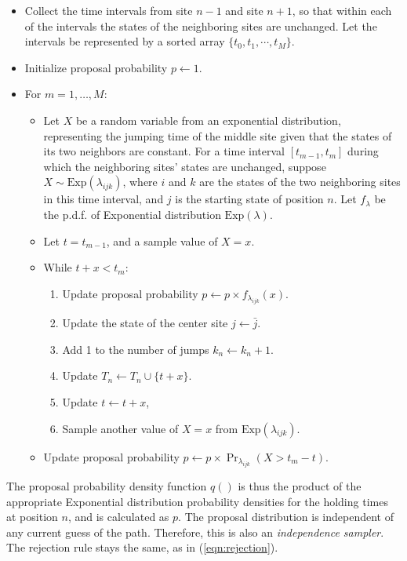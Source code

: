 \documentclass[11pt]{article}
\begin{document}
\begin{itemize}
\item Collect the time intervals from site $n-1$ and site $n+1$, so
  that within each of the intervals the states of the neighboring
  sites are unchanged. Let the intervals be represented by a sorted
  array $\{t_0, t_1, \cdots, t_M\}$. 
\item Initialize proposal probability $p\leftarrow 1$.
\item For $m = 1, \ldots, M$:
  \begin{itemize}
  \item Let $X$ be a random variable from an exponential distribution,
    representing the jumping time of the middle site given that the states
    of its two neighbors are constant.  For a time interval $[t_{m-1},
    t_m]$ during which the neighboring sites' states are unchanged,
    suppose $X \sim \text{Exp}(\lambda_{ijk})$, where $i$ and $k$ are the
    states of the two neighboring sites in this time interval, and $j$ is
    the starting state of position $n$. Let $f_{\lambda}$ be the p.d.f. of
    Exponential distribution $\text{Exp}(\lambda)$.
  \item Let $t = t_{m-1}$, and a sample value of $X=x$.
  \item While $t + x < t_m$:
    \begin{enumerate}[label={(\arabic*)}]
    \item Update proposal probability $p \leftarrow p\times f_{\lambda_{ijk}}(x)$.
    \item Update the state of the center site $j \leftarrow \bar{j}$.
    \item Add 1 to the number of jumps $k_n \leftarrow k_n +1$.
    \item Update $T_n \leftarrow T_n\cup\{t+x\}$.
    \item Update $t \leftarrow  t+x$,
    \item Sample another value of $X=x$ from $\text{Exp}(\lambda_{ijk})$.
    \end{enumerate}
  \item Update proposal probability $p \leftarrow p\times \Pr_{\lambda_{ijk}}(X > t_m - t )$.
  \end{itemize}
\end{itemize}

The proposal probability density function $q()$ is thus the product of
the appropriate Exponential distribution probability densities for the
holding times at position $n$, and is calculated as $p$. The proposal
distribution is independent of any current guess of the
path. Therefore, this is also an \textit{independence sampler}. The
rejection rule stays the same, as in (\ref{eqn:rejection}).
\end{document}
